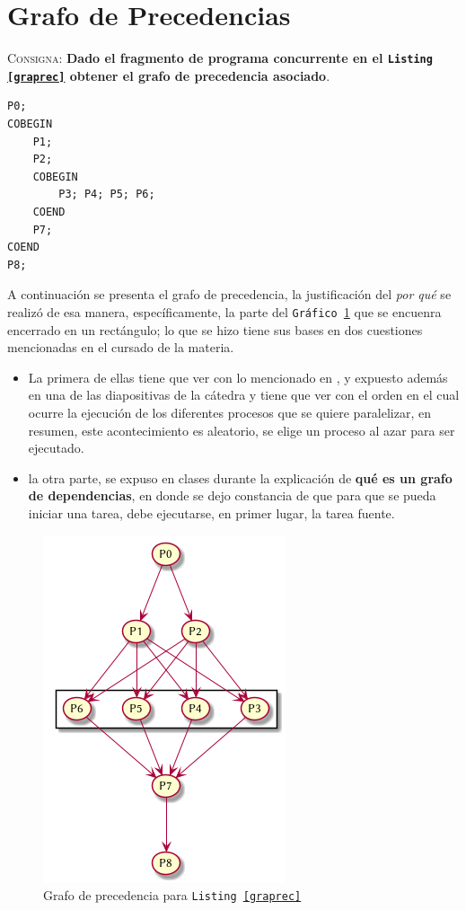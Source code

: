 \documentclass{article}
\begin{document}
\section{Grafo de Precedencias}
\textsc{Consigna}: \textbf{Dado el fragmento de programa concurrente en el \texttt{Listing \ref{graprec}} obtener el grafo de precedencia asociado}.
\newpage
\begin{lstlisting}[caption={Fragmento de programa concurrente}, label=graprec]
P0;
COBEGIN
	P1;
	P2;
	COBEGIN
		P3; P4; P5; P6;
	COEND
	P7;
COEND
P8;
\end{lstlisting}

A continuaci\'on se presenta el grafo de precedencia, la justificaci\'on del
\textit{por qu\'e} se realiz\'o de esa manera, espec\'ificamente, la parte del
\texttt{Gr\'afico \ref{fig:graprec}} que se encuenra encerrado en un
rect\'angulo; lo que se hizo tiene sus bases en dos cuestiones mencionadas
en el cursado de la materia.
\begin{itemize}
\item La primera de ellas tiene que ver con lo mencionado en
\cite{gortazarbellas}, y expuesto adem\'as en una de las diapositivas de la
c\'atedra y tiene que ver con el orden en el cual ocurre la ejecuci\'on de los
diferentes procesos que se quiere paralelizar, en resumen, este
acontecimiento es aleatorio, se elige un proceso al azar para ser ejecutado.
\item la otra parte, se expuso en clases durante la explicaci\'on de
\textbf{qu\'e es un grafo de dependencias}, en donde se dejo constancia de que
para que se pueda iniciar una tarea, debe ejecutarse, en primer lugar, la tarea fuente.
\end{itemize}


\begin{figure}[H]
  \centering
  \includegraphics[width=.4\linewidth]{grafo_precedencia.png}
  \caption{Grafo de precedencia para \texttt{Listing \ref{graprec}}}
  \label{fig:graprec}
\end{figure}
\end{document}
